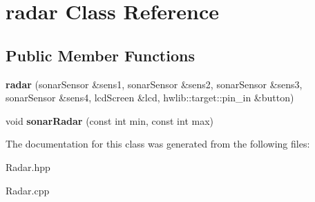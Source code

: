 \hypertarget{classradar}{}\section{radar Class Reference}
\label{classradar}
\subsection*{Public Member Functions}
\begin{DoxyCompactItemize}
\item 
{\bfseries radar} (sonar\+Sensor \&sens1, sonar\+Sensor \&sens2, sonar\+Sensor \&sens3, sonar\+Sensor \&sens4, lcd\+Screen \&lcd, hwlib\+::target\+::pin\+\_\+in \&button)\hypertarget{classradar_a6df43c8ff9f2ba8a017af3442aac852f}{}\label{classradar_a6df43c8ff9f2ba8a017af3442aac852f}

\item 
void {\bfseries sonar\+Radar} (const int min, const int max)\hypertarget{classradar_a0e529d2a1e70a94c26105fea1972874c}{}\label{classradar_a0e529d2a1e70a94c26105fea1972874c}

\end{DoxyCompactItemize}


The documentation for this class was generated from the following files\+:\begin{DoxyCompactItemize}
\item 
Radar.\+hpp\item 
Radar.\+cpp\end{DoxyCompactItemize}
